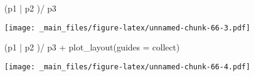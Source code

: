 \documentclass[
]{book}
\newenvironment{Shaded}{\begin{snugshade}}{\end{snugshade}}
\newcommand{\AttributeTok}[1]{\textcolor[rgb]{0.77,0.63,0.00}{#1}}
\newcommand{\FunctionTok}[1]{\textcolor[rgb]{0.00,0.00,0.00}{#1}}
\newcommand{\NormalTok}[1]{#1}
\newcommand{\SpecialCharTok}[1]{\textcolor[rgb]{0.00,0.00,0.00}{#1}}
\newcommand{\StringTok}[1]{\textcolor[rgb]{0.31,0.60,0.02}{#1}}
\begin{document}
\begin{Shaded}
\begin{Highlighting}[]
\NormalTok{(p1 }\SpecialCharTok{|}\NormalTok{ p2 )}\SpecialCharTok{/}\NormalTok{ p3}
\end{Highlighting}
\end{Shaded}

\texttt{[image: \_main\_files/figure-latex/unnamed-chunk-66-3.pdf]}

\begin{Shaded}
\begin{Highlighting}[]
\NormalTok{(p1 }\SpecialCharTok{|}\NormalTok{ p2 )}\SpecialCharTok{/}\NormalTok{ p3 }\SpecialCharTok{+} \FunctionTok{plot\_layout}\NormalTok{(}\AttributeTok{guides =} \StringTok{\textquotesingle{}collect\textquotesingle{}}\NormalTok{)}
\end{Highlighting}
\end{Shaded}

\texttt{[image: \_main\_files/figure-latex/unnamed-chunk-66-4.pdf]}
\end{document}
